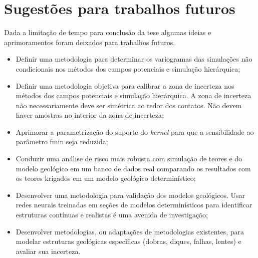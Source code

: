 \begin{itemize}
\end{itemize}

\section{Sugestões para trabalhos futuros}

Dada a limitação de tempo para conclusão da tese algumas ideias e aprimoramentos foram deixados para trabalhos futuros. 

 \begin{itemize}
    \item Definir uma metodologia para determinar os variogramas das simulações não condicionais nos métodos dos campos potenciais e simulação hierárquica; 
    \item Definir uma metodologia objetiva para calibrar a zona de incerteza nos métodos dos campos potenciais e simulação hierárquica. A zona de incerteza não necessariamente deve ser simétrica ao redor dos contatos. Não devem haver amostras no interior da zona de incerteza;
    \item Aprimorar a parametrização do suporte do \textit{kernel} para que a sensibilidade ao parâmetro fmin seja reduzida;
    \item Conduzir uma análise de risco mais robusta com simulação de teores e do modelo geológico em um banco de dados real comparando os resultados com os teores krigados em um modelo geológico determinístico; 
    \item Desenvolver uma metodologia para validação dos modelos geológicos. Usar redes neurais treinadas em seções de modelos determinísticos para identificar estruturas contínuas e realistas é uma avenida de investigação;
    \item Desenvolver metodologias, ou adaptações de metodologias existentes, para modelar estruturas geológicas especĩficas (dobras, diques, falhas, lentes) e avaliar sua incerteza.
 \end{itemize}